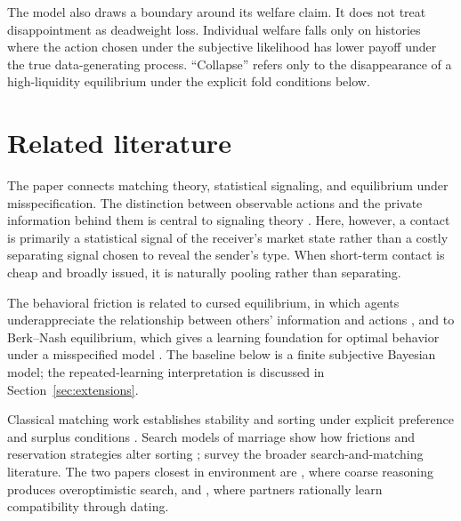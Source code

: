 \documentclass[11pt]{article}
\begin{document}
The model also draws a boundary around its welfare claim. It does not treat
disappointment as deadweight loss. Individual welfare falls only on histories
where the action chosen under the subjective likelihood has lower payoff under
the true data-generating process. ``Collapse'' refers only to the disappearance
of a high-liquidity equilibrium under the explicit fold conditions below.

\section{Related literature}

The paper connects matching theory, statistical signaling, and equilibrium
under misspecification. The distinction between observable actions and the
private information behind them is central to signaling theory
\citep{spence1973}. Here, however, a contact is primarily a statistical signal
of the receiver's market state rather than a costly separating signal chosen to
reveal the sender's type. When short-term contact is cheap and broadly issued,
it is naturally pooling rather than separating.

The behavioral friction is related to cursed equilibrium, in which agents
underappreciate the relationship between others' information and actions
\citep{eyster2005}, and to Berk--Nash equilibrium, which gives a learning
foundation for optimal behavior under a misspecified model
\citep{esponda2016}. The baseline below is a finite subjective Bayesian model;
the repeated-learning interpretation is discussed in Section~\ref{sec:extensions}.

Classical matching work establishes stability and sorting under explicit
preference and surplus conditions \citep{gale1962,becker1973}. Search models of
marriage show how frictions and reservation strategies alter sorting
\citep{burdett1997}; \citet{chade2017} survey the broader search-and-matching
literature. The two papers closest in environment are \citet{antler2022}, where
coarse reasoning produces overoptimistic search, and \citet{antler2026}, where
partners rationally learn compatibility through dating.
\end{document}
